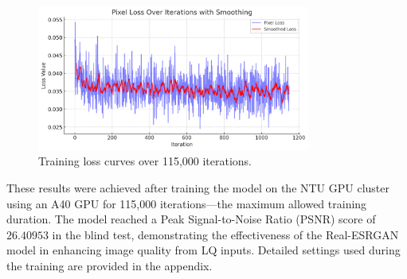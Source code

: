 \begin{figure}[htbp]
    \centering
    \includegraphics[width=0.8\textwidth]{imgs/losses.png}
    \caption{Training loss curves over 115,000 iterations.}
    \label{fig:image5}
\end{figure}

These results were achieved after training the model on the NTU GPU cluster using an A40 GPU for 115,000 iterations—the maximum allowed training duration. The model reached a Peak Signal-to-Noise Ratio (PSNR) score of $26.40953$ in the blind test, demonstrating the effectiveness of the Real-ESRGAN model in enhancing image quality from LQ inputs. Detailed settings used during the training are provided in the appendix.
